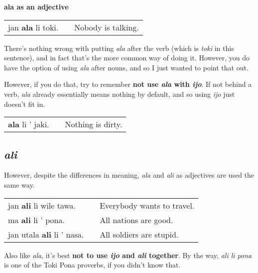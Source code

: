 \textbf{ala as an adjective}

\begin{supertabular}{p{5,5cm}|ll}
jan \textbf{ala} li toki. && Nobody is talking. \\
\end{supertabular} 

There's nothing wrong with putting \textit{ala} after the verb (which is \textit{toki} in this sentence), and in fact that's the more common way of doing it. 
However, you do have the option of using \textit{ala} after nouns, and so I just wanted to point that out. 

However, if you do that, try to remember \textbf{not use \textit{ala} with \textit{ijo}}. 
If not behind a verb, \textit{ala} already essentially means nothing by default, and so using \textit{ijo} just doesn't fit in.

\begin{supertabular}{p{5,5cm}|ll}
\textbf{ala} li ' jaki. && Nothing is dirty. \\
\end{supertabular} 
%
\subsection*{\textit{ali}}
%
However, despite the differences in meaning, \textit{ala} and \textit{ali} as adjectives are used the same way.

\begin{supertabular}{p{5,5cm}|ll}
jan \textbf{ali} li wile tawa. && Everybody wants to travel. \\
ma \textbf{ali} li ' pona. && All nations are good. \\
jan utala \textbf{ali} li ' nasa. && All soldiers are stupid.
\end{supertabular} 

Also like \textit{ala}, it's best \textbf{not to use \textit{ijo} and \textit{ali} together}. 
By the way, \textit{ali li pona} is one of the Toki Pona proverbs, if you didn't know that.  
%
\newpage
{}
